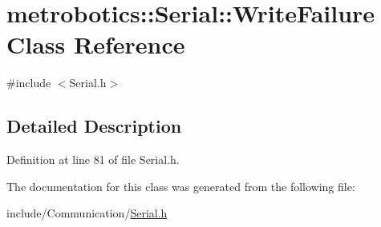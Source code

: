 \hypertarget{classmetrobotics_1_1Serial_1_1WriteFailure}{\section{metrobotics\-:\-:\-Serial\-:\-:\-Write\-Failure \-Class \-Reference}
\label{classmetrobotics_1_1Serial_1_1WriteFailure}
}


{\ttfamily \#include $<$\-Serial.\-h$>$}



\subsection{\-Detailed \-Description}


\-Definition at line 81 of file \-Serial.\-h.



\-The documentation for this class was generated from the following file\-:\begin{DoxyCompactItemize}
\item 
include/\-Communication/\hyperlink{Serial_8h}{\-Serial.\-h}\end{DoxyCompactItemize}

